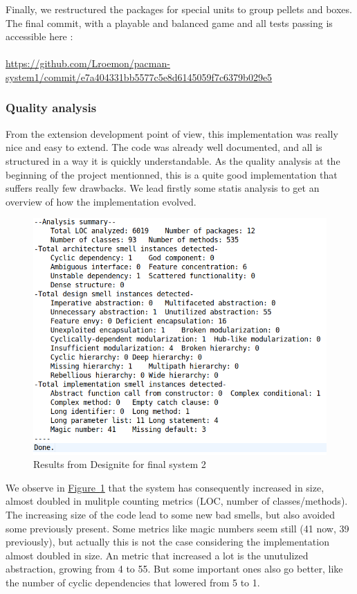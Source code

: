 \documentclass[]{article}
\newcommand{\wordlink}[2]{\hyperref[#2]{#1~\ref{#2}}}
\begin{document}
\vspace{0.4cm}

Finally, we restructured the packages for special units to group pellets and boxes. The final commit, with a playable and balanced game and all tests passing is accessible here :\\~\\
\url{https://github.com/Lroemon/pacman-system1/commit/e7a404331bb5577c5e8d6145059f7c6379b029e5}

\subsubsection{Quality analysis}

\indent From the extension development point of view, this implementation was really nice and easy to extend. The code was already well documented, and all is structured in a way it is quickly understandable. As the quality analysis at the beginning of the project mentionned, this is a quite good implementation that suffers really few drawbacks.
We lead firstly some statis analysis to get an overview of how the implementation evolved. 


\begin{figure}[h]
\centering
\includegraphics[width=0.7\linewidth]{S1-designite_final}
\caption{Results from Designite for final system 2}
\label{fig:S1_designite_final}
\end{figure}

\newpage

We observe in \wordlink{Figure}{fig:S1_designite_final} that the system has consequently increased in size, almost doubled in mulitple counting metrics (LOC, number of classes/methods). The increasing size of the code lead to some new bad smells, but also avoided some previously present. Some metrics like magic numbers seem still (41 now, 39 previously), but actually this is not the case considering the implementation almost doubled in size. An metric that increased a lot is the unutulized abstraction, growing from 4 to 55. But some important ones also go better, like the number of cyclic dependencies that lowered from 5 to 1.\\
\end{document}
